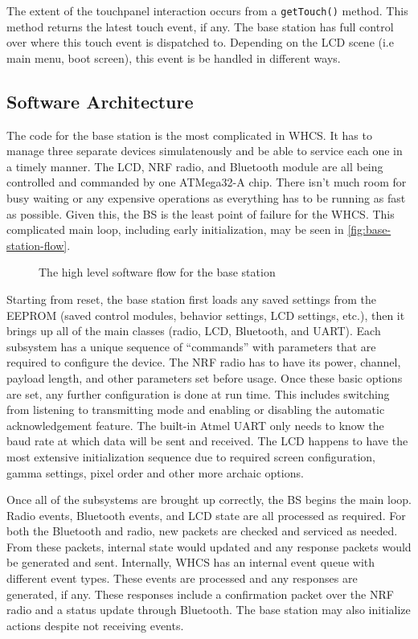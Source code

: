\documentclass[draft,twocolumn,letterpaper,10pt]{IEEEtran}
\newcommand{\ucffig}[3]{
\begin{figure}[h]
\centering
\makebox[\linewidth][c]{
#2
}
\caption{#3}
\label{#1}
\end{figure}
}
\newcommand{\ucfgfx}[4][scale=1.0]{
\ucffig{#2}{\texttt{[image: \#3]}}{#4}
}
\begin{document}
The extent of the touchpanel interaction occurs from a \texttt{getTouch()}
method. This method returns the latest touch event, if any. The base
station has full control over where this touch event is dispatched to.
Depending on the LCD scene (i.e main menu, boot screen), this event is be
handled in different ways.

\subsection{Software Architecture}
The code for the base station is the most complicated in WHCS. It has to manage
three separate devices simulatenously and be able to service each one in a
timely manner. The LCD, NRF radio, and Bluetooth module are all being
controlled and commanded by one ATMega32-A chip. There isn't much room for busy
waiting or any expensive operations as everything has to be running as fast as
possible. Given this, the BS is the least point of failure for the WHCS. This
complicated main loop, including early initialization, may be seen in
\autoref{fig:base-station-flow}.

\ucfgfx[width=0.8\linewidth]{fig:base-station-flow}{base-station-flow}{The high level software flow for the base station}

Starting from reset, the base station first loads any saved settings from the
EEPROM (saved control modules, behavior settings, LCD settings, etc.), then it
brings up all of the main classes (radio, LCD, Bluetooth, and UART).
Each subsystem has a unique sequence of ``commands'' with parameters that are
required to configure the device. The NRF radio has to have its power, channel,
payload length, and other parameters set before usage. Once these basic
options are set, any further configuration is done at run time. This includes
switching from listening to transmitting mode and enabling or disabling the
automatic acknowledgement feature. The built-in Atmel UART only needs to know
the baud rate at which data will be sent and received. 
The LCD happens to have the most extensive initialization sequence due to
required screen configuration, gamma settings, pixel order and other more
archaic options.

Once all of the subsystems are brought up correctly, the BS begins the main loop.
Radio events, Bluetooth events, and LCD state are all processed as
required. For both the Bluetooth and radio, new packets are checked
and serviced as needed. From these packets, internal state would updated and any
response packets would be generated and sent. Internally, WHCS has an
internal event queue with different event types. These events are processed
and any responses are generated, if any. These responses include a
confirmation packet over the NRF radio and a status update through Bluetooth.
The base station may also initialize actions despite not receiving events.
\end{document}
